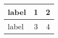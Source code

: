 \begin{tabular}{l *{2}{|c}}
  \toprule
  label & 1 & 2 \\ \midrule     %
  label & 3 & 4 \\
  \bottomrule
\end{tabular}